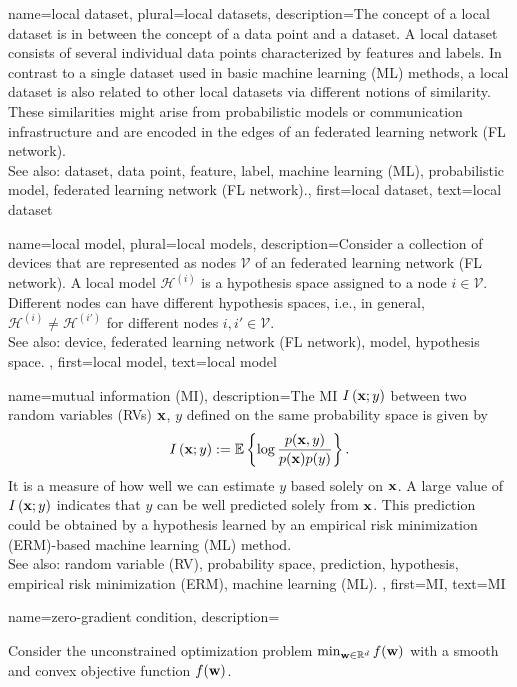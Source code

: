 {	
{name={local dataset}, plural={local datasets}, 
	description={The concept of a local dataset is 
		in between the concept of a data point and a dataset. A local dataset consists of several 
		individual data points characterized by features and labels. 
		In contrast to a single dataset used in basic machine learning (ML) methods, a local dataset is also 
		related to other local datasets via different notions of similarity. These similarities 
		might arise from probabilistic models or communication infrastructure and 
		are encoded in the edges of an federated learning network (FL network).
				\\
		See also: dataset, data point, feature, label, machine learning (ML), probabilistic model, federated learning network (FL network).},
		first={local dataset},
		text={local dataset}
}
	
{name={local model}, plural={local models}, 
	description={Consider a collection of devices that are represented 
		as nodes $\mathcal{V}$ of an federated learning network (FL network). A local model $\mathcal{H}^{(i)}$ 
		is a hypothesis space assigned to a node $i \in \mathcal{V}$. Different nodes can have 
		different hypothesis spaces, i.e., in general, $\mathcal{H}^{(i)} \neq \mathcal{H}^{(i')}$ 
		for different nodes $i, i' \in \mathcal{V}$. 
				\\
		See also: device, federated learning network (FL network), model, hypothesis space. },
	first={local model},
	text={local model}
}
	
{name={mutual information (MI)},
 	description={The MI $I \left( {\bf x};y\right)$ 
 		between two random variables (RVs) ${\bf x}$, $y$ defined on the same probability space 
 		is given by \cite{coverthomas} $$I \left( {\bf x};y\right) := 
		\mathbb{E}  \left\{ \log \frac{p ({\bf x},y)}{p({\bf x})p(y)} \right\}.$$ 
		It is a measure of how well we can estimate $y$ based 
		solely on ${\bf x}$. A large value of $I \left( {\bf x};y\right)$ indicates that 
		$y$ can be well predicted solely from ${\bf x}$. This prediction could be obtained by a 
		hypothesis learned by an empirical risk minimization (ERM)-based machine learning (ML) method. 
				\\
		See also: random variable (RV), probability space, prediction, hypothesis, empirical risk minimization (ERM), machine learning (ML). }, 
	first={MI}, 
	text={MI} 
}

{name={zero-gradient condition},
	description={Consider the unconstrained 
		optimization problem $\min_{{\bf w} \in \mathbb{R}^{d}} f({\bf w})$  with 
			a smooth and convex objective function $f({\bf w})$. 
			\begin{figure}[htbp] 
			\centering
			\begin{tikzpicture}[scale=1.1,x=2cm]
				

\end{tikzpicture}
\end{figure}}}}
